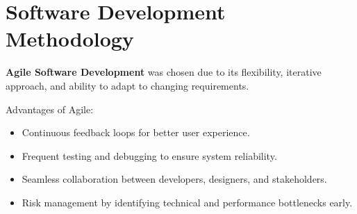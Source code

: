 \section{Software Development Methodology}

\textbf{Agile Software Development} was chosen due to its flexibility, iterative approach, and ability to adapt to changing requirements.

Advantages of Agile:
\begin{itemize}
    \item Continuous feedback loops for better user experience.
    \item Frequent testing and debugging to ensure system reliability.
    \item Seamless collaboration between developers, designers, and stakeholders.
    \item Risk management by identifying technical and performance bottlenecks early.
\end{itemize}
